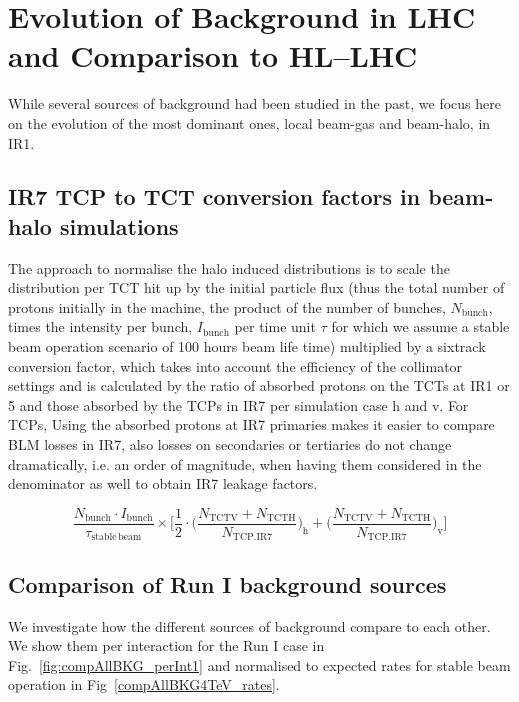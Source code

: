 \newpage
\section{Evolution of Background in LHC and Comparison to HL--LHC\label{evolut}}

While several sources of background had been studied in the past, we focus here on the evolution of the most dominant ones, local beam-gas and beam-halo, in IR1. 


\subsection{IR7 TCP to TCT conversion factors in beam-halo simulations}
The approach to normalise the halo induced distributions is to scale the distribution per TCT hit up by the initial particle flux (thus the total number of protons initially in the machine, the product of the number of bunches, $N_{\mathrm{bunch}}$, times the intensity per bunch, $I_{\mathrm{bunch}}$ per time unit $\tau$ for which we assume a stable beam operation scenario of 100 hours beam life time) multiplied by a sixtrack conversion factor, which takes into account the efficiency of the collimator settings and is calculated by the ratio of absorbed protons on the TCTs at IR1 or 5 and those absorbed by the TCPs in IR7 per simulation case h and v. For TCPs,  Using the absorbed protons at IR7 primaries makes it easier to compare BLM losses in IR7, also losses on secondaries or tertiaries do not change dramatically, i.e. an order of magnitude, when having them considered in the denominator as well to obtain IR7 leakage factors.

\begin{equation} \label{eq3}
\frac{N_{\mathrm{bunch}} \cdot I_{\mathrm{bunch}}}{\tau_{\mathrm{stable \, beam}}} \times \Bigg[ \frac{1}{2} \cdot \Big( \frac{N_{\mathrm{TCTV}} + N_{\mathrm{TCTH}}}{N_{\mathrm{TCP.IR7}}}\Big)_{\mathrm{h}} + \Big( \frac{N_{\mathrm{TCTV}} + N_{\mathrm{TCTH}}}{N_{\mathrm{TCP.IR7}}} \Big)_{\mathrm{v}}  \Bigg]
\end{equation}



\subsection{Comparison of Run I background sources}
We investigate how the different sources of background compare to each other. We show them per interaction for the Run I case in Fig.~\ref{fig:compAllBKG_perInt1} and normalised to expected rates for stable beam operation in Fig~\ref{compAllBKG4TeV_rates}.


